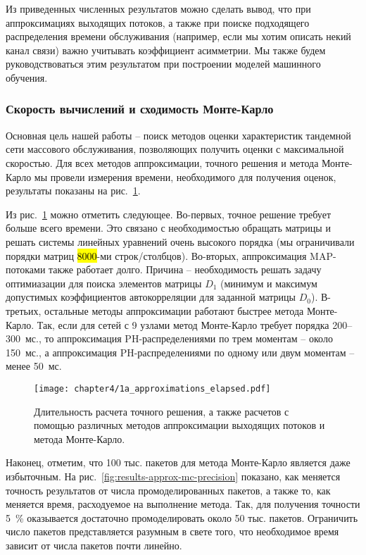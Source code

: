 Из приведенных численных результатов можно сделать вывод, что при аппроксимациях выходящих потоков, а также при поиске подходящего распределения времени обслуживания (например, если мы хотим описать некий канал связи) важно учитывать коэффициент асимметрии. Мы также будем руководствоваться этим результатом при построении моделей машинного обучения.

\clearpage
\subsubsection{Скорость вычислений и сходимость Монте-Карло}

Основная цель нашей работы -- поиск методов оценки характеристик тандемной сети массового обслуживания, позволяющих получить оценки с максимальной скоростью. Для всех методов аппроксимации, точного решения и метода Монте-Карло мы провели измерения времени, необходимого для получения оценок, результаты показаны на рис.~\ref{fig:results-approx-elapsed}.

Из рис.~\ref{fig:results-approx-elapsed} можно отметить следующее. Во-первых, точное решение требует больше всего времени. Это связано с необходимостью обращать матрицы и решать системы линейных уравнений очень высокого порядка (мы ограничивали порядки матриц \hl{8000}-ми строк/столбцов). Во-вторых, аппроксимация MAP-потоками также работает долго. Причина -- необходимость решать задачу оптимиазации для поиска элементов матрицы $D_1$ (минимум и максимум допустимых коэффициентов автокорреляции для заданной матрицы $D_0$). В-третьих, остальные методы аппроксимации работают быстрее метода Монте-Карло. Так, если для сетей с 9 узлами метод Монте-Карло требует порядка 200--300~мс., то аппроксимация PH-распределениями по трем моментам -- около 150~мс., а аппроксимация PH-распределениями по одному или двум моментам -- менее 50~мс.

\begin{figure}[h]
    \texttt{[image: chapter4/1a\_approximations\_elapsed.pdf]}
    \caption{Длительность расчета точного решения, а также расчетов с помощью различных методов аппроксимации выходящих потоков и метода Монте-Карло.}\label{fig:results-approx-elapsed}
\end{figure}

Наконец, отметим, что 100 тыс. пакетов для метода Монте-Карло является даже избыточным. На рис.~\ref{fig:results-approx-mc-precision} показано, как меняется точность результатов от числа промоделированных пакетов, а также то, как меняется время, расходуемое на выполнение метода. Так, для получения точности 5~\% оказывается достаточно промоделировать около 50 тыс. пакетов. Ограничить число пакетов представляется разумным в свете того, что необходимое время зависит от числа пакетов почти линейно.

